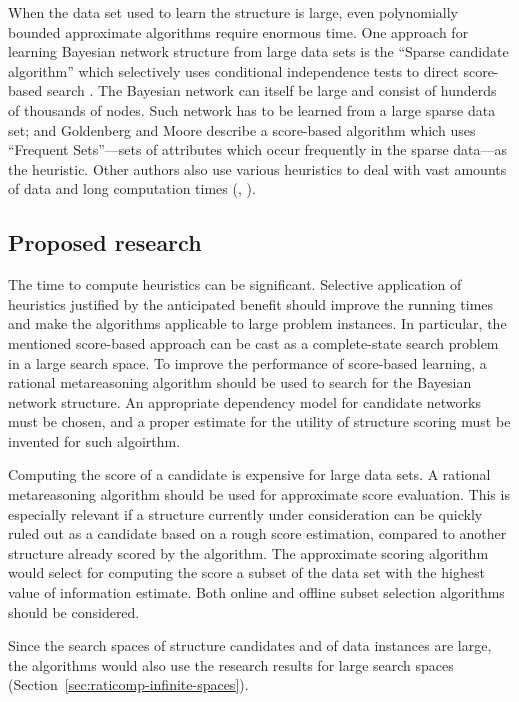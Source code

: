When the data set used to learn the structure is large, even
polynomially bounded approximate algorithms require enormous time. One
approach for learning Bayesian network structure from large data sets
is the ``Sparse candidate algorithm'' which selectively uses
conditional independence tests to direct score-based
search \cite{Friedman.sparsecandidate}. The Bayesian network can itself
be large and consist of hunderds of thousands of nodes. Such network
has to be learned from a large sparse data set; and Goldenberg and Moore
\cite{Goldenberg.sparsedata} describe a score-based algorithm which uses
``Frequent Sets''---sets of attributes which occur frequently in the
sparse data---as the heuristic. Other authors also use various
heuristics to deal with vast amounts of data and long computation
times (\cite{Zhou.clustering}, \cite{Boyen.hidden}).

\subsection{Proposed research}
\label{sec:app-bnlearn-research}

The time to compute heuristics can be significant. Selective
application of heuristics justified by the anticipated benefit should
improve the running times and make the algorithms applicable to large
problem instances. In particular, the mentioned score-based approach
can be cast as a complete-state search problem in a large search
space. To improve the performance of score-based learning,
a rational metareasoning algorithm should be used to search for
the Bayesian network structure. An appropriate dependency model for
candidate networks must be chosen, and a proper estimate for the
utility of structure scoring must be invented for such algoirthm. 

Computing the score of a candidate is expensive for large data sets. A
rational metareasoning algorithm should be used for approximate score
evaluation. This is especially relevant if a structure currently under
consideration can be quickly ruled out as a candidate based on a rough
score estimation, compared to another structure already scored by the
algorithm.  The approximate scoring algorithm would select for
computing the score a subset of the data set with the highest value of
information estimate. Both online and offline subset selection
algorithms \cite{Guestrin.graphical} should be considered.

Since the search spaces of structure candidates and of data instances
are large, the algorithms would also use the research results for
large search spaces (Section~\ref{sec:raticomp-infinite-spaces}).

